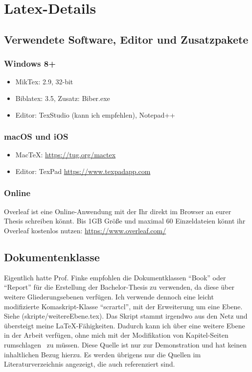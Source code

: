 \newpage

\section{Latex-Details}

\subsection{Verwendete Software, Editor und Zusatzpakete}
\subsubsection{Windows 8+}
\begin{itemize}
\item MikTex: 2.9, 32-bit
\item Biblatex: 3.5, Zusatz: Biber.exe
\item Editor: TexStudio (kann ich empfehlen), Notepad++
\end{itemize}

\subsubsection{macOS und iOS}
\begin{itemize}
\item MacTeX: \url{https://tug.org/mactex}
\item Editor: TexPad \url{https://www.texpadapp.com}
\end{itemize}



\subsubsection{Online}
Overleaf ist eine Online-Anwendung mit der Ihr direkt im Browser an eurer Thesis schreiben könnt. Bis 1GB Größe und
maximal 60 Einzeldateien könnt ihr Overleaf kostenlos nutzen: \url{https://www.overleaf.com/}


\subsection{Dokumentenklasse}
Eigentlich hatte Prof. Finke empfohlen die Dokumentklassen \enquote{Book} oder \enquote{Report} für die Erstellung der
Bachelor-Thesis zu verwenden, da diese über weitere Gliederungsebenen verfügen. Ich verwende dennoch eine leicht
modifizierte Komaskript-Klasse \enquote{scrartcl}, mit der Erweiterung um eine Ebene. Siehe (skripte/weitereEbene.tex).
Das Skript stammt irgendwo aus den Netz und übersteigt meine \LaTeX{}-Fähigkeiten. Dadurch kann ich über eine weitere
Ebene in der Arbeit verfügen, ohne mich mit der Modifikation von Kapitel-Seiten rumschlagen~
 zu müssen. Diese Quelle ist nur zur Demonstration und hat keinen inhaltlichen
Bezug hierzu. Es werden übrigens nur die Quellen im Literaturverzeichnis angezeigt, die auch referenziert sind.


